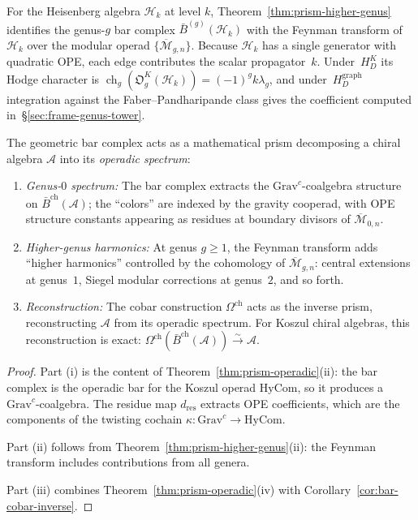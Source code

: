 \begin{example}
For the Heisenberg algebra $\mathcal{H}_k$ at level $k$,
Theorem~\ref{thm:prism-higher-genus} identifies the genus-$g$ bar
complex $\bar{B}^{(g)}(\mathcal{H}_k)$ with the Feynman transform of
$\mathcal{H}_k$ over the modular operad
$\{\overline{\mathcal{M}}_{g,n}\}$.  Because $\mathcal{H}_k$ has a
single generator with quadratic OPE, each edge contributes the scalar
propagator~$k$.  Under~$H_D^K$ its Hodge character is
$\operatorname{ch}_g(\mathfrak O_g^K(\mathcal H_k))=
(-1)^gk\lambda_g$, and under~$H_D^{\mathrm{graph}}$ integration
against the Faber--Pandharipande class gives the
coefficient computed in~\S\ref{sec:frame-genus-tower}.
\end{example}

\begin{corollary}\label{cor:prism-principle}
The geometric bar complex acts as a mathematical prism decomposing a
chiral algebra $\mathcal{A}$ into its \emph{operadic spectrum}:
\begin{enumerate}[label=\textup{(\roman*)}]
\item \emph{Genus-$0$ spectrum:} The bar complex extracts the
 $\mathrm{Grav}^c$-coalgebra structure on $\bar{B}^{\mathrm{ch}}(
 \mathcal{A})$; the ``colors'' are indexed by the gravity cooperad,
 with OPE structure constants appearing as residues at boundary
 divisors of $\overline{\mathcal{M}}_{0,n}$.
\item \emph{Higher-genus harmonics:} At genus $g \geq 1$, the
 Feynman transform adds ``higher harmonics'' controlled by the
 cohomology of $\overline{\mathcal{M}}_{g,n}$: central extensions
 at genus~$1$, Siegel modular corrections at genus~$2$, and
 so forth.
\item \emph{Reconstruction:} The cobar construction
 $\Omega^{\mathrm{ch}}$ acts as the inverse prism, reconstructing
 $\mathcal{A}$ from its operadic spectrum. For Koszul chiral
 algebras, this reconstruction is exact:
 $\Omega^{\mathrm{ch}}(\bar{B}^{\mathrm{ch}}(\mathcal{A}))
 \xrightarrow{\sim} \mathcal{A}$.
\end{enumerate}
\end{corollary}

\begin{proof}
Part (i) is the content of Theorem~\ref{thm:prism-operadic}(ii):
the bar complex is the operadic bar for the Koszul operad
$\mathrm{HyCom}$, so it produces a $\mathrm{Grav}^c$-coalgebra.
The residue map $d_{\mathrm{res}}$ extracts OPE coefficients, which
are the components of the twisting cochain
$\kappa\colon \mathrm{Grav}^c \to \mathrm{HyCom}$.

Part (ii) follows from Theorem~\ref{thm:prism-higher-genus}(ii):
the Feynman transform includes contributions from all genera.

Part (iii) combines
Theorem~\ref{thm:prism-operadic}(iv)
with Corollary~\ref{cor:bar-cobar-inverse}.
\end{proof}

